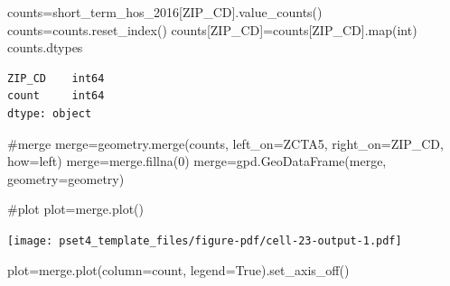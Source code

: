 \documentclass[
  letterpaper,
  DIV=11,
  numbers=noendperiod]{scrartcl}
\newenvironment{Shaded}{\begin{snugshade}}{\end{snugshade}}
\newcommand{\BuiltInTok}[1]{\textcolor[rgb]{0.00,0.23,0.31}{#1}}
\newcommand{\CommentTok}[1]{\textcolor[rgb]{0.37,0.37,0.37}{#1}}
\newcommand{\DecValTok}[1]{\textcolor[rgb]{0.68,0.00,0.00}{#1}}
\newcommand{\NormalTok}[1]{\textcolor[rgb]{0.00,0.23,0.31}{#1}}
\newcommand{\OperatorTok}[1]{\textcolor[rgb]{0.37,0.37,0.37}{#1}}
\newcommand{\StringTok}[1]{\textcolor[rgb]{0.13,0.47,0.30}{#1}}
\newcommand{\VariableTok}[1]{\textcolor[rgb]{0.07,0.07,0.07}{#1}}
\begin{document}
\begin{Shaded}
\begin{Highlighting}[]
\NormalTok{counts}\OperatorTok{=}\NormalTok{short\_term\_hos\_2016[}\StringTok{\textquotesingle{}ZIP\_CD\textquotesingle{}}\NormalTok{].value\_counts()}
\NormalTok{counts}\OperatorTok{=}\NormalTok{counts.reset\_index()}
\NormalTok{counts[}\StringTok{\textquotesingle{}ZIP\_CD\textquotesingle{}}\NormalTok{]}\OperatorTok{=}\NormalTok{counts[}\StringTok{\textquotesingle{}ZIP\_CD\textquotesingle{}}\NormalTok{].}\BuiltInTok{map}\NormalTok{(}\BuiltInTok{int}\NormalTok{)}
\NormalTok{counts.dtypes}
\end{Highlighting}
\end{Shaded}

\begin{verbatim}
ZIP_CD    int64
count     int64
dtype: object
\end{verbatim}

\begin{Shaded}
\begin{Highlighting}[]
\CommentTok{\#merge}
\NormalTok{merge}\OperatorTok{=}\NormalTok{geometry.merge(counts, left\_on}\OperatorTok{=}\StringTok{\textquotesingle{}ZCTA5\textquotesingle{}}\NormalTok{, right\_on}\OperatorTok{=}\StringTok{\textquotesingle{}ZIP\_CD\textquotesingle{}}\NormalTok{, how}\OperatorTok{=}\StringTok{\textquotesingle{}left\textquotesingle{}}\NormalTok{)}
\NormalTok{merge}\OperatorTok{=}\NormalTok{merge.fillna(}\DecValTok{0}\NormalTok{)}
\NormalTok{merge}\OperatorTok{=}\NormalTok{gpd.GeoDataFrame(merge, geometry}\OperatorTok{=}\StringTok{\textquotesingle{}geometry\textquotesingle{}}\NormalTok{)}
\end{Highlighting}
\end{Shaded}

\begin{Shaded}
\begin{Highlighting}[]
\CommentTok{\#plot}
\NormalTok{plot}\OperatorTok{=}\NormalTok{merge.plot()}
\end{Highlighting}
\end{Shaded}

\texttt{[image: pset4\_template\_files/figure-pdf/cell-23-output-1.pdf]}

\begin{Shaded}
\begin{Highlighting}[]
\NormalTok{plot}\OperatorTok{=}\NormalTok{merge.plot(column}\OperatorTok{=}\StringTok{\textquotesingle{}count\textquotesingle{}}\NormalTok{, legend}\OperatorTok{=}\VariableTok{True}\NormalTok{).set\_axis\_off()}
\end{Highlighting}
\end{Shaded}
\end{document}
